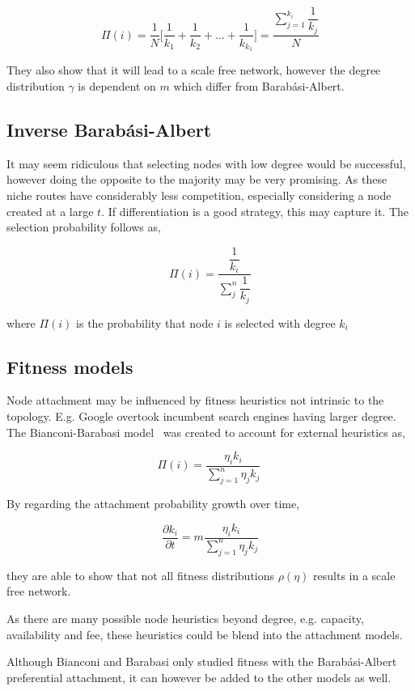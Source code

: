 \[ \Pi(i) = \dfrac{1}{N} \bigg\lbrack \dfrac{1}{k_1} + \dfrac{1}{k_2} + ... + \dfrac{1}{k_{k_1}} \bigg\rbrack = \dfrac{\sum_{j=1}^{k_i}\dfrac{1}{k_j}}{N} \]

They also show that it will lead to a scale free network, however the \gls{degree distribution} $\gamma$ is dependent on $m$ which differ from Barabási-Albert.

\subsection{Inverse Barabási-Albert}


It may seem ridiculous that selecting nodes with low degree would be successful, however doing the opposite to the majority may be very promising. As these niche routes have considerably less competition, especially considering a \gls{node} created at a large $t$. If differentiation is a good strategy, this may capture it. The selection probability follows as, 

\[ \Pi(i) =  \dfrac{\dfrac{1}{k_i}}{\sum_{j}^{n} \dfrac{1}{k_j}} \]

where $\Pi(i)$ is the probability that node $i$ is selected with degree $k_i$

\subsection{Fitness models}

Node attachment may be influenced by fitness heuristics not intrinsic to the topology. E.g. Google overtook incumbent search engines having larger degree. The Bianconi-Barabasi model~\cite{bianconi:barabasi:fitness:network} was created to account for external heuristics as,

\[ \Pi(i) = \dfrac{\eta_ik_i}{\sum_{j=1}^{n}\eta_jk_j}\ \]

By regarding the attachment probability growth over time,

\[ \dfrac{\partial k_i}{\partial t} = m \dfrac{\eta_ik_i}{\sum_{j=1}^{n}\eta_jk_j} \]

they are able to show that not all fitness distributions $\rho(\eta)$ results in a scale free network.

As there are many possible \gls{node} heuristics beyond degree, e.g. capacity, availability and fee, these heuristics could be blend into the attachment models. 

Although Bianconi and Barabasi only studied fitness with the Barabási-Albert preferential attachment, it can however be added to the other models as well.

